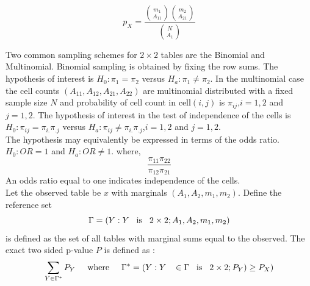 \documentclass[12pt,oneside]{report}
\theoremstyle{definition}
\theoremstyle{mystyle}
\begin{document}
\begin{equation}
p_{X}= \frac{\binom{m_{1}}{A_{11}}\binom{m_{2}}{A_{21}}}{\binom{N}{A_{1}}}
\end{equation}

\vspace{5mm}

Two common sampling schemes for $2\times2$ tables are the Binomial and Multinomial. Binomial sampling is obtained by fixing the row sums. %
The hypothesis of interest is 
$H_{0}:\pi_{1}=\pi_{2}$ versus $H_{a}:\pi_{1}\neq \pi_{2}$. In the multinomial case the cell counts $(A_{11},A_{12},A_{21},A_{22})$ are multinomial distributed with a fixed sample size $N$ and probability of  cell  count in cell$(i,j)$ is $\pi_{ij}$,$i=1,2$ and $j=1,2$. The hypothesis of interest in the test of independence of the cells    is  $H_{0}:\pi_{ij}=\pi_{i.}\pi_{.j}$ versus $H_{a}:\pi_{ij}\neq \pi_{i.}\pi_{.j}$,$i=1,2$ and $j=1,2$.\\
The hypothesis may equivalently be expressed in terms of the odds ratio.$H_{0}:OR=1$ and $H_{a}:OR\neq 1$. where,
\begin{equation*}
\frac{\pi_{11}\pi_{22}}{\pi_{12}\pi_{21}}
\end{equation*}
 An odds ratio equal to one indicates independence of the cells.\\
Let the observed table be $x$ with marginals $(A_{1},A_{2},m_{1},m_{2})$.
Define the reference set
\begin{equation*}
\Gamma=(Y:Y\hspace{3mm} \mbox{is}\hspace{3mm} 2\times2 ;A_{1},A_{2},m_{1},m_{2})
\end{equation*}
  is defined as the set of all tables with marginal sums  equal to the observed. The exact two sided p-value $P$ is defined as :
\begin{equation*}
\sum\limits_{Y \in \Gamma^{*}}P_{Y}  \hspace{5mm} \text{where}\hspace{5mm}
\Gamma^{*}=\left(Y:Y\hspace{3mm} \in \Gamma \hspace{3mm} \text{is}\hspace{3mm} 2\times2 ;P_{Y})\geq P_{X}\right)
\end{equation*}
\end{document}
